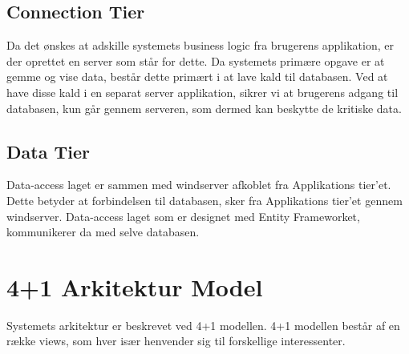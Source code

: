 \subsection{Connection Tier}\label{sec:Connectiontier}
Da det ønskes at adskille systemets business logic fra brugerens applikation, er der oprettet en server som står for dette. Da systemets primære opgave er at gemme og vise data, består dette primært i at lave kald til databasen. Ved at have disse kald i en separat server applikation, sikrer vi at brugerens adgang til databasen, kun går gennem serveren, som dermed kan beskytte de kritiske data.

\subsection{Data Tier}
Data-access laget er sammen med \gls{windserver} afkoblet fra Applikations tier'et. Dette betyder at forbindelsen til databasen, sker fra Applikations tier'et gennem \gls{windserver}. Data-access laget som er designet med Entity Frameworket, kommunikerer da med selve databasen.
\section{4+1 Arkitektur Model}
Systemets arkitektur er beskrevet ved 4+1 modellen. 4+1 modellen består af en række views, som hver især henvender sig til forskellige interessenter.


